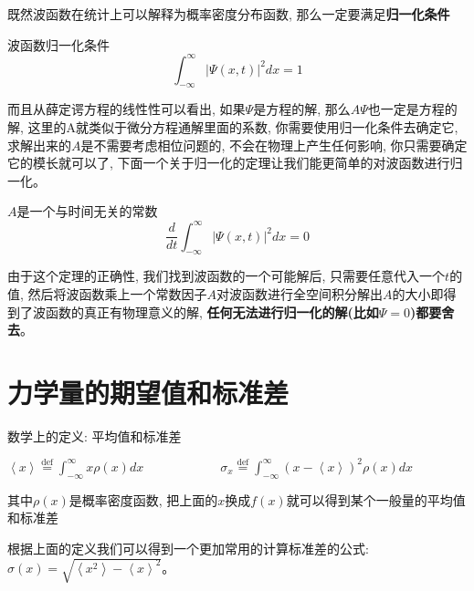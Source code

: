 \documentclass[a4paper,zihao=-4,linespread=1]{ctexrep}
\newenvironment{lequation}{\large\begin{equation}}{\end{equation}}
\begin{document}
    既然波函数在统计上可以解释为概率密度分布函数, 那么一定要满足\textbf{归一化条件}
    \begin{proposition}{波函数归一化条件}
        \begin{lequation}\label{normalized}
            \int_{-\infty}^{\infty}\left|\Psi\left(x,t\right)\right|^{2}dx=1
        \end{lequation}
    \end{proposition}
    而且从薛定谔方程的线性性可以看出, 如果$\Psi$是方程的解, 那么$A\Psi$也一定是方程的解, 这里的A就类似于微分方程通解里面的系数, 你需要使用归一化条件去确定它, 求解出来的$A$是不需要考虑相位问题的, 不会在物理上产生任何影响, 你只需要确定
    它的模长就可以了, 下面一个关于归一化的定理让我们能更简单的对波函数进行归一化。
    \begin{theorem}{$A$是一个与时间无关的常数}
        \begin{lequation}
            \frac{d}{dt}\int_{-\infty}^{\infty}\left|\Psi\left(x,t\right)\right|^{2}dx=0
        \end{lequation}
    \end{theorem}
    由于这个定理的正确性, 我们找到波函数的一个可能解后, 只需要任意代入一个$t$的值, 然后将波函数乘上一个常数因子$A$对波函数进行全空间积分解出$A$的大小即得到了波函数的真正有物理意义的解, \textbf{任何无法进行归一化的解(比如$\Psi=0$)都要舍去}。
    \section{力学量的期望值和标准差}
    \begin{define}{数学上的定义: 平均值和标准差}
        \begin{center}
        \begin{math}
            \displaystyle
            \left \langle x \right \rangle \overset{\text{def}}{=}\int_{-\infty}^{\infty}x\rho(x)dx \qquad\qquad\qquad
            \sigma _{x}\overset{\text{def}}{=}\int_{-\infty }^{\infty } (x-\left \langle x \right \rangle )^2\rho(x)dx
        \end{math}
        \end{center}
        其中$\rho(x)$是概率密度函数, 把上面的$x$换成$f(x)$就可以得到某个一般量的平均值和标准差
    \end{define}
    根据上面的定义我们可以得到一个更加常用的计算标准差的公式: $\sigma(x)=\sqrt{\left \langle x^2 \right \rangle-\left \langle x \right \rangle^2}$。
    
\end{document}
